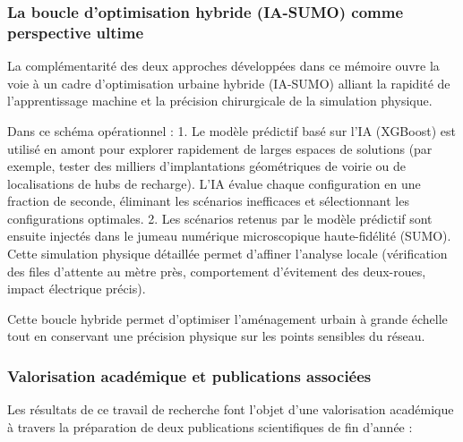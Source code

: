 \documentclass[11pt, a4paper]{article}
\begin{document}
\subsubsection{La boucle d'optimisation hybride (IA-SUMO) comme
perspective
ultime}\label{la-boucle-doptimisation-hybride-ia-sumo-comme-perspective-ultime}

La complémentarité des deux approches développées dans ce mémoire ouvre
la voie à un cadre d'optimisation urbaine hybride (IA-SUMO) alliant la
rapidité de l'apprentissage machine et la précision chirurgicale de la
simulation physique.

Dans ce schéma opérationnel : 1. Le modèle prédictif basé sur l'IA
(XGBoost) est utilisé en amont pour explorer rapidement de larges
espaces de solutions (par exemple, tester des milliers d'implantations
géométriques de voirie ou de localisations de hubs de recharge). L'IA
évalue chaque configuration en une fraction de seconde, éliminant les
scénarios inefficaces et sélectionnant les configurations optimales. 2.
Les scénarios retenus par le modèle prédictif sont ensuite injectés dans
le jumeau numérique microscopique haute-fidélité (SUMO). Cette
simulation physique détaillée permet d'affiner l'analyse locale
(vérification des files d'attente au mètre près, comportement
d'évitement des deux-roues, impact électrique précis).

Cette boucle hybride permet d'optimiser l'aménagement urbain à grande
échelle tout en conservant une précision physique sur les points
sensibles du réseau.

\subsubsection{Valorisation académique et publications
associées}\label{valorisation-acaduxe9mique-et-publications-associuxe9es}

Les résultats de ce travail de recherche font l'objet d'une valorisation
académique à travers la préparation de deux publications scientifiques
de fin d'année :
\end{document}
